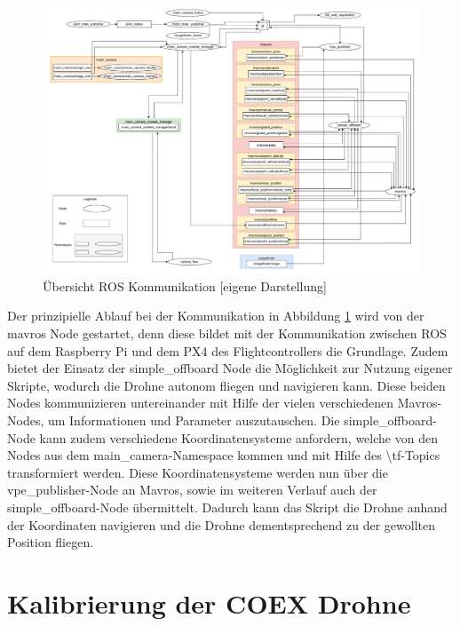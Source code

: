     \begin{landscape}
        \begin{figure}
            \includegraphics[width=\paperwidth,keepaspectratio]{images/graph_ros.pdf}
            \caption[Übersicht ROS Kommunikation]{\label{img ros_communication} Übersicht ROS Kommunikation [eigene Darstellung]}
        \end{figure}
    \end{landscape}


Der prinzipielle Ablauf bei der Kommunikation in Abbildung \ref{img ros_communication} wird von der mavros Node gestartet, denn diese bildet mit der Kommunikation zwischen ROS auf dem Raspberry Pi und dem PX4 des Flightcontrollers die Grundlage. Zudem bietet der Einsatz der simple\_offboard Node die Möglichkeit zur Nutzung eigener Skripte, wodurch die Drohne autonom fliegen und navigieren kann. Diese beiden Nodes kommunizieren untereinander mit Hilfe der vielen verschiedenen Mavros-Nodes, um Informationen und Parameter auszutauschen. Die simple\_offboard-Node kann zudem verschiedene Koordinatensysteme anfordern, welche von den Nodes aus dem main\_camera-Namespace kommen und mit Hilfe des \textbackslash tf-Topics transformiert werden. Diese Koordinatensysteme werden nun über die vpe\_publisher-Node an Mavros, sowie im weiteren Verlauf auch der simple\_offboard-Node übermittelt. Dadurch kann das Skript die Drohne anhand der Koordinaten navigieren und die Drohne dementsprechend zu der gewollten Position fliegen.
 

\section{Kalibrierung der COEX Drohne} \label{kalibrierung_coex__drohne:subsection}
